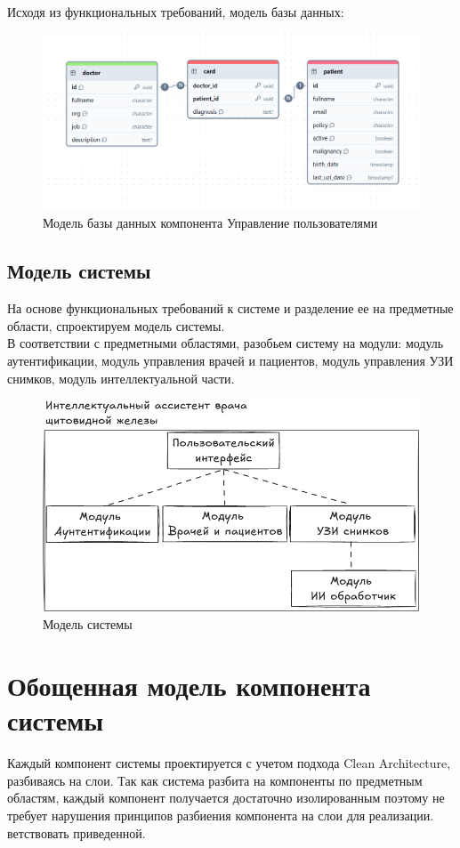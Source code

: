 Исходя из функциональных требований, модель базы данных:
\begin{figure}[H]%
	\begin{center}
		\includegraphics[width=.5\columnwidth]{./img/new/med_db.png}%
	\end{center}
	\caption{Модель базы данных компонента Управление пользователями}%
	\label{pic:med_db}%
\end{figure}

\subsection{Модель системы}

На основе функциональных требований к системе и разделение ее на предметные области, спроектируем модель системы.\\
В соответствии с предметными областями, разобьем систему на модули: модуль аутентификации, модуль управления врачей и пациентов, модуль управления УЗИ снимков, модуль интеллектуальной части.\\

\begin{figure}[H]%
	\begin{center}
		\includegraphics[width=.6\columnwidth]{./img/new/system_model.png}%
	\end{center}
	\caption{Модель системы}%
	\label{pic:system_model}%
\end{figure}

\section{Обощенная модель компонента системы}

Каждый компонент системы проектируется с учетом подхода Clean Architecture, разбиваясь на слои.
Так как система разбита на компоненты по предметным областям, каждый компонент получается достаточно изолированным поэтому не 
требует нарушения принципов разбиения компонента на слои для реализации.
ветствовать приведенной.

